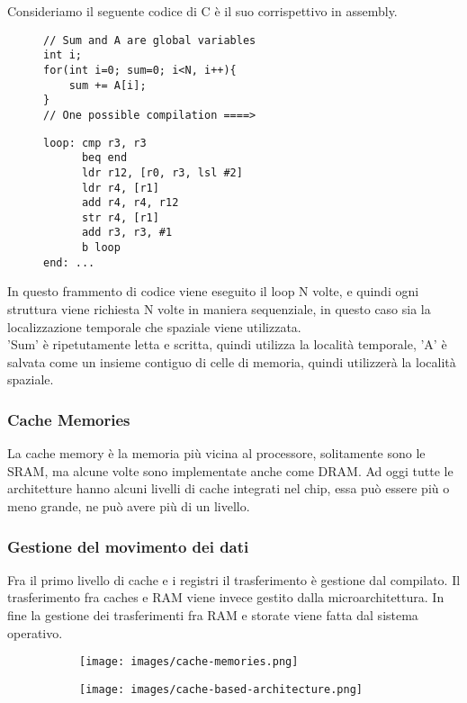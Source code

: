 \hspace{-15pt}Consideriamo il seguente codice di C è il suo corrispettivo in assembly.
\begin{figure}[!h]
\begin{minipage}[t]{0.45\linewidth}
\centering
\begin{lstlisting}
// Sum and A are global variables
int i;
for(int i=0; sum=0; i<N, i++){
    sum += A[i];
}
// One possible compilation ====>
\end{lstlisting}
\end{minipage}
\hspace{.35cm}
\begin{minipage}[t]{0.45\linewidth}
\begin{lstlisting}
loop: cmp r3, r3
      beq end
      ldr r12, [r0, r3, lsl #2]
      ldr r4, [r1]
      add r4, r4, r12
      str r4, [r1]
      add r3, r3, #1
      b loop
end: ...
\end{lstlisting}
\end{minipage}
\end{figure}

In questo frammento di codice viene eseguito il loop N volte, e quindi ogni struttura viene richiesta N volte in maniera sequenziale, in questo caso sia la localizzazione temporale che spaziale viene utilizzata.\\
'Sum' è ripetutamente letta e scritta, quindi utilizza la località temporale, 'A' è salvata come un insieme contiguo di celle di memoria, quindi utilizzerà la località spaziale.
\newpage
\subsubsection{Cache Memories}
La cache memory è la memoria più vicina al processore, solitamente sono le SRAM, ma alcune volte sono implementate anche come DRAM. Ad oggi tutte le architetture hanno alcuni livelli di cache integrati nel chip, essa può essere più o meno grande, ne può avere più di un livello.

\subsubsection{Gestione del movimento dei dati}
Fra il primo livello di cache e i registri il trasferimento è gestione dal compilato. Il trasferimento fra caches e RAM viene invece gestito dalla microarchitettura. In fine la gestione dei trasferimenti fra RAM e storate viene fatta dal sistema operativo.

\begin{figure}[h!]
    \centering
    \begin{subfigure}{.45\textwidth}
        \centering
        \texttt{[image: images/cache-memories.png]}
        \caption{}
    \end{subfigure}
    \begin{subfigure}{.45\textwidth}
        \centering
        \texttt{[image: images/cache-based-architecture.png]}
        \caption{}
    \end{subfigure}
\end{figure}
    

